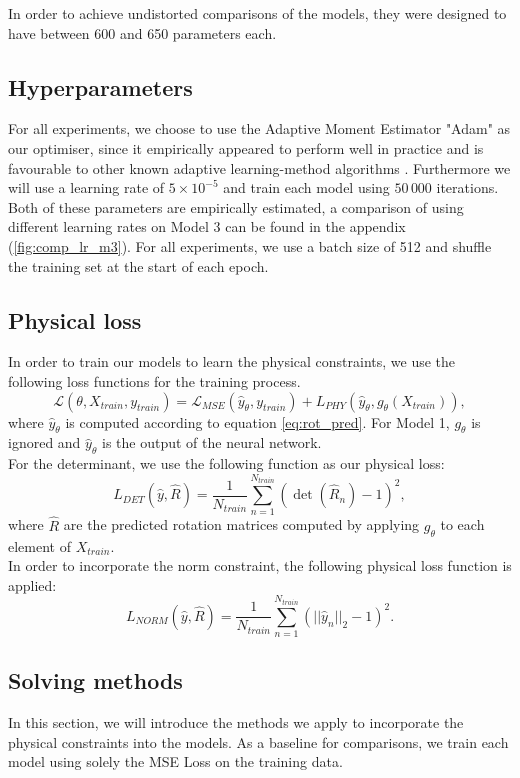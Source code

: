 \indent In order to achieve undistorted comparisons of the models, they were designed to have between 600 and 650 parameters each.

\subsection{Hyperparameters}
For all experiments, we choose to use the Adaptive Moment Estimator "Adam" as our optimiser, since it empirically appeared to perform well in practice and is favourable to other known adaptive learning-method algorithms \cite{DBLP:journals/corr/Ruder16}. Furthermore we will use a learning rate of $5\times 10^{-5}$ and train each model using $50\,000$ iterations. Both of these parameters are empirically estimated, a comparison of using different learning rates on Model 3 can be found in the appendix (\ref{fig:comp_lr_m3}). For all experiments, we use a batch size of 512 and shuffle the training set at the start of each epoch.

\subsection{Physical loss}
In order to train our models to learn the physical constraints, we use the following loss functions for the training process.
\[\mathcal{L}(\theta, X_{train}, y_{train}) = \mathcal{L}_{MSE}(\hat{y}_\theta, y_{train}) + L_{PHY}(\hat{y}_\theta, g_\theta(X_{train})),\]
where $\hat{y}_\theta$ is computed according to equation \eqref{eq:rot_pred}. For Model 1, $g_\theta$ is ignored and $\hat{y}_\theta$ is the output of the neural network.\\
For the determinant, we use the following function as our physical loss:
\[L_{DET}(\hat{y}, \hat{R}) = \frac{1}{N_{train}}\sum_{n = 1}^{N_{train}}(\det(\hat{R}_n) - 1)^2,\]
where $\hat{R}$ are the predicted rotation matrices computed by applying $g_\theta$ to each element of $X_{train}$.\\
In order to incorporate the norm constraint, the following physical loss function is applied:
\[L_{NORM}(\hat{y}, \hat{R}) = \frac{1}{N_{train}}\sum_{n = 1}^{N_{train}}(||\hat{y}_n||_2 - 1)^2. \]

\subsection{Solving methods}
In this section, we will introduce the methods we apply to incorporate the physical constraints into the models. As a baseline for comparisons, we train each model using solely the MSE Loss on the training data.

